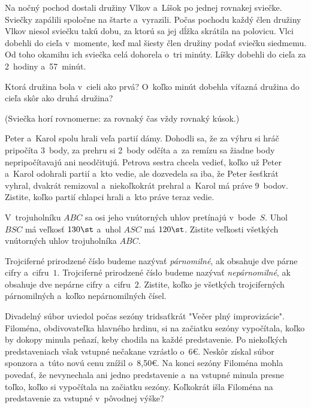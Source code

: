 {%
Na nočný pochod dostali družiny Vlkov a~Líšok po jednej rovnakej sviečke.
Sviečky zapálili spoločne na štarte a~vyrazili. Počas pochodu každý člen družiny Vlkov niesol sviečku takú dobu,
za ktorú sa jej dĺžka skrátila na polovicu. Vlci dobehli do cieľa v~momente,
keď mal šiesty člen družiny podať sviečku siedmemu. Od toho okamihu ich sviečka celá dohorela o~tri minúty. Líšky dobehli do cieľa za 2~hodiny a~57~minút.
\begin{itemize}
  \iitem Ktorá družina bola v~cieli ako prvá?
  \iitem O~koľko minút dobehla víťazná družina do cieľa skôr ako druhá družina?
\end{itemize}
(Sviečka horí rovnomerne: za rovnaký čas vždy rovnaký kúsok.)
}

{%
Peter a~Karol spolu hrali veľa partií dámy. Dohodli sa, že za výhru si hráč pripočíta 3~body, za prehru si 2~body odčíta a~za remízu sa žiadne body nepripočítavajú ani neodčitujú. Petrova sestra chcela vedieť, koľko už Peter a~Karol odohrali partií a~kto vedie, ale dozvedela sa iba, že Peter šesťkrát vyhral, dvakrát remizoval a~niekoľkokrát prehral a~Karol má práve 9~bodov. Zistite, koľko partií chlapci hrali a~kto práve teraz vedie.
}

{%
V~trojuholníku $ABC$ sa osi jeho vnútorných uhlov pretínajú v~bode~$S$. Uhol
$BSC$ má veľkosť $130\st$ a~uhol $ASC$ má $120\st$. Zistite veľkosti všetkých vnútorných uhlov trojuholníka $ABC$.}

{%
Trojciferné prirodzené číslo budeme nazývať {\it párnomilné}, ak obsahuje dve párne cifry a~cifru~$1$. Trojciferné prirodzené číslo budeme nazývať {\it nepárnomilné},
ak obsahuje dve nepárne cifry a~cifru~$2$. Zistite, koľko je všetkých trojciferných párnomilných a~koľko nepárnomilných čísel.}

{%
Divadelný súbor uviedol počas sezóny tridsaťkrát "Večer plný improvizácie". Filoména, obdivovateľka hlavného hrdinu, si na začiatku sezóny vypočítala, koľko by dokopy minula peňazí, keby chodila na každé predstavenie. Po niekoľkých predstaveniach však vstupné nečakane vzrástlo o~6€. Neskôr získal súbor sponzora a~túto novú cenu znížil o~8{,}50€. Na konci sezóny Filoména mohla povedať, že nevynechala ani jedno predstavenie a~na vstupné minula presne toľko, koľko si vypočítala na začiatku sezóny. Koľkokrát išla Filoména na predstavenie za vstupné v~pôvodnej výške?}

